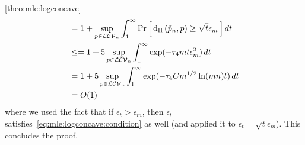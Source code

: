 \documentclass[11pt]{article}
\theoremstyle{definition}
\newcommand{\eps}{\epsilon}
\newcommand{\classlogconcave}{\ensuremath{\mathcal{LCV}}\xspace}
\newcommand{\hellinger}[2]{{\operatorname{d_{\rm{}H}}\left({#1, #2}\right)}}
\newcommand{\proba}{\Pr}
\newcommand{\probaOf}[1]{\proba\left[\, #1\, \right]}
\begin{document}
\begin{proofof}{\cref{theo:mle:logconcave}}
\begin{align*}
        &= 1+ \sup_{p\in\classlogconcave_n} \int_1^\infty {  \probaOf{  \hellinger{\tilde{p}_n}{p} \geq \sqrt{t}\eps_{m} } }\, dt \\
        &\leq = 1+ 5\sup_{p\in\classlogconcave_n} \int_1^\infty \exp(-\tau_4 m t\eps_m^2)\, dt \\
        &= 1+ 5\sup_{p\in\classlogconcave_n} \int_1^\infty \exp(-\tau_4 Cm^{1/2}\ln(mn) t)\, dt \\
        &= O(1)
    \end{align*}
    where we used the fact that if $\eps_t > \eps_m$, then $\eps_t$ satisfies~\eqref{eq:mle:logconcave:condition} as well (and applied it to $\eps_t = \sqrt{t}\eps_{m}$). This concludes the proof.
\end{proofof}
 
\end{document}
